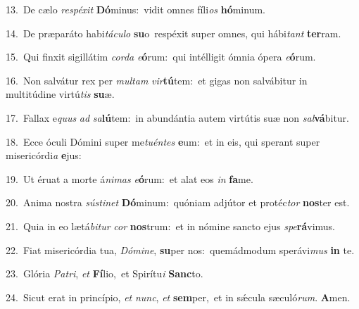 {\numbfont\textcolor{\numbcolor}{13.}}~De cælo \textit{re}\-\textit{spé}\textit{xit} \textbf{Dó}\-minus:~\star vidit omnes fíli\textit{os} \textbf{hó}\-minum.\par
{\numbfont\textcolor{\numbcolor}{14.}}~De præparáto habi\-\textit{tá}\-\textit{cu}\textit{lo} \textbf{su}\-o~\star respéxit super omnes, qui hábi\textit{tant} \textbf{ter}\-ram.\par
{\numbfont\textcolor{\numbcolor}{15.}}~Qui finxit sigillátim \textit{cor}\-\textit{da} \textit{e}\-\textbf{ó}rum:~\star qui intélligit ómnia ópera \textit{e}\-\textbf{ó}rum.\par
{\numbfont\textcolor{\numbcolor}{16.}}~Non salvátur rex per \textit{mul}\-\textit{tam} \textit{vir}\-\textbf{tú}tem:~\star et gigas non salvábitur in multitúdine virtú\textit{tis} \textbf{su}\-æ.\par
{\numbfont\textcolor{\numbcolor}{17.}}~Fallax e\textit{quus} \textit{ad} \textit{sa}\-\textbf{lú}tem:~\star in abundántia autem virtútis suæ non \textit{sal}\-\textbf{vá}bitur.\par
{\numbfont\textcolor{\numbcolor}{18.}}~Ecce óculi Dómini super me\-\textit{tu}\-\textit{én}\textit{tes} \textbf{e}\-um:~\star et in eis, qui sperant super misericórdi\textit{a} \textbf{e}\-jus:\par
{\numbfont\textcolor{\numbcolor}{19.}}~Ut éruat a morte á\-\textit{ni}\-\textit{mas} \textit{e}\-\textbf{ó}rum:~\star et alat eos \textit{in} \textbf{fa}\-me.\par
{\numbfont\textcolor{\numbcolor}{20.}}~Anima nostra \textit{sús}\-\textit{ti}\textit{net} \textbf{Dó}\-minum:~\star quóniam adjútor et protéc\textit{tor} \textbf{nos}\-ter est.\par
{\numbfont\textcolor{\numbcolor}{21.}}~Quia in eo lætá\-\textit{bi}\-\textit{tur} \textit{cor} \textbf{nos}\-trum:~\star et in nómine sancto ejus \textit{spe}\-\textbf{rá}vimus.\par
{\numbfont\textcolor{\numbcolor}{22.}}~Fiat misericórdia tua, \textit{Dó}\-\textit{mi}\textit{ne}, \textbf{su}\-per nos:~\star quemádmodum sperávi\textit{mus} \textbf{in} te.\par
{\numbfont\textcolor{\numbcolor}{23.}}~Glória \textit{Pa}\-\textit{tri}, \textit{et} \textbf{Fí}\-lio,~\star et Spirítu\textit{i} \textbf{Sanc}\-to.\par
{\numbfont\textcolor{\numbcolor}{24.}}~Sicut erat in princípio, \textit{et} \textit{nunc}\-, \textit{et} \textbf{sem}\-per,~\star et in sǽcula sæculó\-\textit{rum}\-. \textbf{A}\-men.\par
